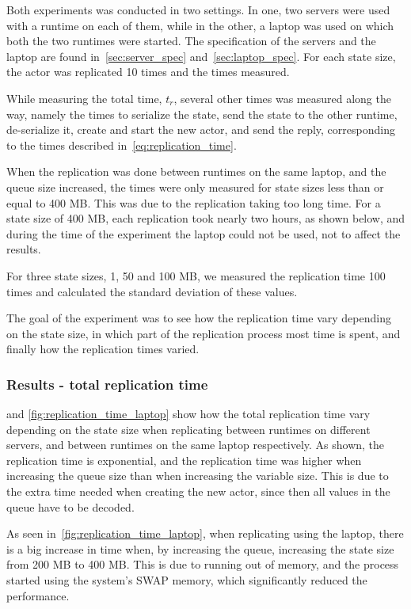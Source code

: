 \documentclass{cslthse-msc}
\begin{document}
Both experiments was conducted in two settings. In one, two servers were used with a runtime on each of them, while in the other, a laptop was used on which both the two runtimes were started. The specification of the servers and the laptop are found in~\cref{sec:server_spec} and~\cref{sec:laptop_spec}. For each state size, the actor was replicated 10 times and the times measured.

While measuring the total time, $t_r$, several other times was measured along the way, namely the times to serialize the state, send the state to the other runtime, de-serialize it, create and start the new actor, and send the reply, corresponding to the times described in~\cref{eq:replication_time}.

When the replication was done between runtimes on the same laptop, and the queue size increased, the times were only measured for state sizes less than or equal to 400 MB. This was due to the replication taking too long time. For a state size of 400 MB, each replication took nearly two hours, as shown below, and during the time of the experiment the laptop could not be used, not to affect the results.

For three state sizes, 1, 50 and 100 MB, we measured the replication time 100 times and calculated the standard deviation of these values.

The goal of the experiment was to see how the replication time vary depending on the state size, in which part of the replication process most time is spent, and finally how the replication times varied.

\subsubsection*{Results - total replication time}
 and \cref{fig:replication_time_laptop} show how the total replication time vary depending on the state size when replicating between runtimes on different servers, and between runtimes on the same laptop respectively. As shown, the replication time is exponential, and the replication time was higher when increasing the queue size than when increasing the variable size. This is due to the extra time needed when creating the new actor, since then all values in the queue have to be decoded. %

As seen in~\cref{fig:replication_time_laptop}, when replicating using the laptop, there is a big increase in time when, by increasing the queue, increasing the state size from 200 MB to 400 MB. This is due to running out of memory, and the process started using the system's SWAP memory, which significantly reduced the performance. 
\end{document}
